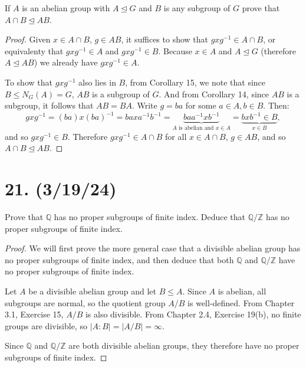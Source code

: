 \documentclass{article}
\begin{document}
If $A$ is an abelian group with $A \unlhd G$ and $B$ is any subgroup of $G$ prove that $A \cap B \unlhd AB$.

\begin{proof}
    Given $x \in A \cap B$, $g \in AB$, it suffices to show that $gxg^{-1} \in A \cap B$, or equivalenty that $gxg^{-1} \in A$ and $gxg^{-1} \in B$. Because $x \in A$ and $A \unlhd G$ (therefore $A \unlhd AB$) we already have $gxg^{-1} \in A$.

    To show that $gxg^{-1}$ also lies in $B$, from Corollary 15, we note that since $B \leq N_G(A) = G$, $AB$ is a subgroup of $G$. And from Corollary 14, since $AB$ is a subgroup, it follows that $AB = BA$. Write $g = ba$ for some $a \in A, b \in B$. Then:
    \begin{equation*}
        gxg^{-1} = (ba)x(ba)^{-1} = baxa^{-1}b^{-1} = \underbrace{baa^{-1}xb^{-1}}_{A \text{ is abelian and $x \in A$}} = \underbrace{bxb^{-1} \in B}_\text{$x \in B$},
    \end{equation*}
    and so $gxg^{-1} \in B$. Therefore $gxg^{-1} \in A \cap B$ for all $x \in A \cap B$, $g \in AB$, and so $A \cap B \unlhd AB$.
\end{proof}

\section*{21. (3/19/24)}

Prove that $\mathbb{Q}$ has no proper subgroups of finite index. Deduce that $\mathbb{Q}/\mathbb{Z}$ has no proper subgroups of finite index.

\begin{proof}
    We will first prove the more general case that a divisible abelian group has no proper subgroups of finite index, and then deduce that both $\mathbb{Q}$ and $\mathbb{Q}/\mathbb{Z}$ have no proper subgroups of finite index.

    Let $A$ be a divisible abelian group and let $B \leq A$. Since $A$ is abelian, all subgroups are normal, so the quotient group $A/B$ is well-defined. From Chapter 3.1, Exercise 15,  $A/B$ is also divisible. From Chapter 2.4, Exercise 19(b), no finite groups are divisible, so $|A:B| = |A/B| = \infty$.

    Since $\mathbb{Q}$ and $\mathbb{Q}/\mathbb{Z}$ are both divisible abelian groups, they therefore have no proper subgroups of finite index.
\end{proof}
\end{document}
